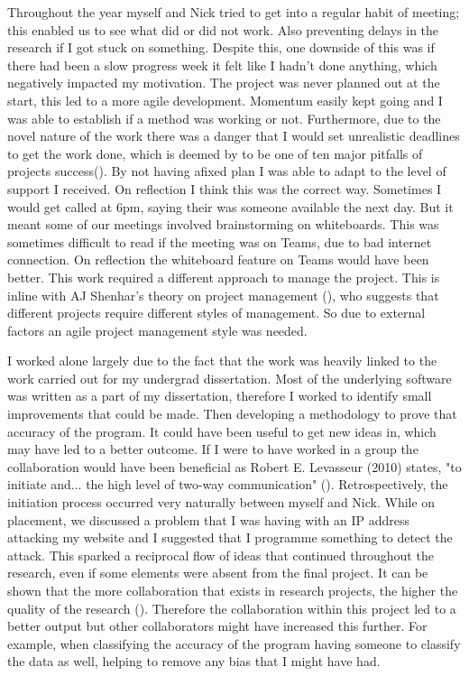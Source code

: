 Throughout the year myself and Nick tried to get into a regular habit of meeting; this enabled us to see what did or did not work. Also preventing delays in the research if I got stuck on something. Despite this, one downside of this was if there had been a slow progress week it felt like I hadn't done anything, which negatively impacted my motivation. The project was never planned out at the start, this led to a more agile development. Momentum easily kept going and I was able to establish if a method was working or not. Furthermore, due to the novel nature of the work there was a danger that I would set unrealistic deadlines to get the work done, which is deemed by \citeauthor{GanttPRO} to be one of ten major pitfalls of projects success(\cite{GanttPRO}). By not having afixed plan I was able to adapt to the level of support I received. On reflection I think this was the correct way. Sometimes I would get called at 6pm, saying their was someone available the next day. But it meant some of our meetings involved brainstorming on whiteboards. This was sometimes difficult to read if the meeting was on Teams, due to bad internet connection. On reflection the whiteboard feature on Teams would have been better.  This work required a different approach to manage the project. This is inline with AJ Shenhar's theory on project management (\cite{Shenhar1}), who suggests that different projects require different styles of management. So due to external factors an agile project management style was needed.

I worked alone largely due to the fact that the work was heavily linked to the work carried out for my undergrad dissertation. Most of the underlying software was written as a part of my dissertation, therefore I worked to identify small improvements that could be made. Then developing a methodology to prove that accuracy of the program. It could have been useful to get new ideas in, which may have led to a better outcome. If I were to have worked in a group the collaboration would have been beneficial as Robert E. Levasseur (2010) states, "to initiate and... the high level of two-way communication" (\cite{levasseur2010people}). Retrospectively, the initiation process occurred very naturally between myself and Nick. While on placement, we discussed a problem that I was having with an IP address attacking my website and I suggested that I programme something to detect the attack. This sparked a reciprocal flow of ideas that continued throughout the research, even if some elements were absent from the final project. It can be shown that the more collaboration that exists in research projects, the higher the quality of the research (\cite{figg2006scientific}). Therefore the collaboration within this project led to a better output but other collaborators might have increased this further. For example, when classifying the accuracy of the program having someone to classify the data as well, helping to remove any bias that I might have had.



